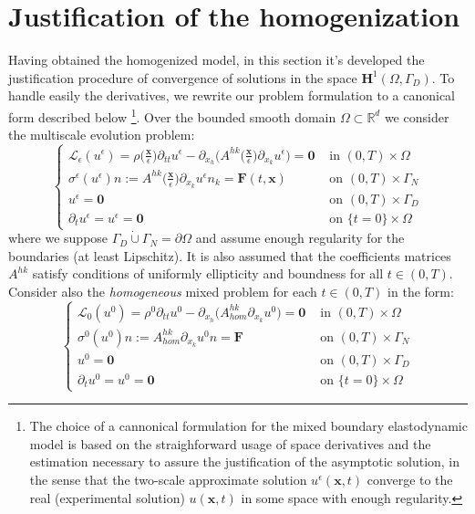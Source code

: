 \section{Justification of the homogenization}
Having obtained the homogenized model, in this section it's developed the justification procedure of convergence of solutions in the space $\mathbf{H}^1(\Omega, \Gamma_D)$. To handle easily the derivatives, we rewrite our problem formulation to a canonical form described below \footnote{The choice of a cannonical formulation for the mixed boundary elastodynamic model is based on the straighforward usage of space derivatives and the estimation necessary to assure the justification of the asymptotic solution, in the sense that the two-scale approximate solution $u^{\epsilon}(\mathbf{x},t)$ converge to the real (experimental solution) $u(\mathbf{x},t)$ in some space with enough regularity.}.
Over the bounded smooth domain $\Omega \subset \mathbb{R}^d$ we consider the multiscale evolution problem:
\begin{equation}
    \label{MainMultiPDE}
    \left \{
    \begin{array}{cc}
        \mathcal{L}_{\epsilon}(u^{\epsilon}) = \rho\big( \frac{\mathbf{x}}{\epsilon} \big) \partial_{tt} u^{\epsilon} - \partial_{x_h} \big( A^{hk}\big( \frac{\mathbf{x}}{\epsilon} \big) \partial_{x_k} u^{\epsilon} \big)  = \mathbf{0} & \text{ in } (0,T)\times \Omega  \\
        \sigma^{\epsilon}(u^{\epsilon}) n := A^{hk}\big( \frac{\mathbf{x}}{\epsilon} \big) \partial_{x_k} u^{\epsilon} n_k  = \mathbf{F}(t,\mathbf{x}) & \text{ on } (0,T) \times \Gamma_N \\
        u^{\epsilon} =  \mathbf{0} & \text{ on } (0,T) \times \Gamma_D \\
        \partial_t u^{\epsilon} = u^{\epsilon} = \mathbf{0} & \text{ on } \{ t=0 \} \times \Omega 
    \end{array}
    \right.
\end{equation}
where we suppose $\Gamma_D \dot \cup \Gamma_N = \partial \Omega$ and assume enough regularity for the boundaries (at least Lipschitz). It is also assumed that the coefficients matrices $A^{hk}$ satisfy conditions of uniformly ellipticity and boundness for all $t \in (0,T)$. \\
Consider also the \textit{homogeneous} mixed problem for each $t \in (0,T)$ in the form:
\begin{equation}
    \label{HomMultiPDE}
    \left \{
    \begin{array}{ccc}
        \mathcal{L}_0 (u^0) = \rho^0 \partial_{tt} u^0 - \partial_{x_h}\big( A^{hk}_{hom} \partial_{x_k} u^0 \big) = \mathbf{0} & \text{ in } (0,T)\times \Omega \\
        \sigma^0(u^0)n := A^{hk}_{hom} \partial_{x_k}u^0 n = \mathbf{F} & \text{ on } (0,T) \times \Gamma_N \\
        u^0 = \mathbf{0} & \text{ on } (0,T) \times \Gamma_D \\
        \partial_t u^0 = u^0 = \mathbf{0} & \text{ on } \{ t=0 \} \times \Omega
    \end{array}
    \right .
\end{equation}
